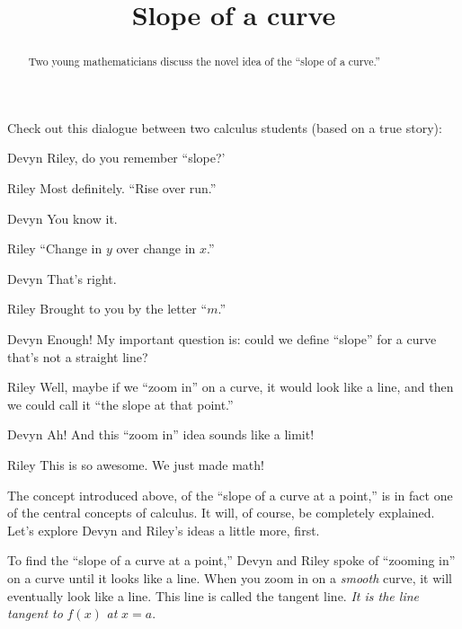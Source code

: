 \documentclass{ximera}
\title[Break-Ground:]{Slope of a curve}
\begin{document}
\begin{abstract}
Two young mathematicians discuss the novel idea of the ``slope of a curve.''
\end{abstract}
\maketitle


Check out this dialogue between two calculus students (based on a true
story):

\begin{dialogue}
\item[Devyn] Riley, do you remember ``slope?'
\item[Riley] Most definitely. ``Rise over run.''
\item[Devyn] You know it.
\item[Riley] ``Change in $y$ over change in $x$.''
\item[Devyn] That's right.  
\item[Riley] Brought to you by the letter ``$m$.''
\item[Devyn] Enough! My important question is: could we define
  ``slope'' for a curve that's not a straight line?
\item[Riley] Well, maybe if we ``zoom in'' on a curve, it would look
  like a line, and then we could call it ``the slope at that point.''
\item[Devyn] Ah! And this ``zoom in'' idea sounds like a limit!
\item[Riley] This is so awesome. We just made math!
\end{dialogue}

The concept introduced above, of the ``slope of a curve at a point,''
is in fact one of the central concepts of calculus. It will,
of course, be completely explained.  Let's explore Devyn
and Riley's ideas a little more, first.



To find the ``slope of a curve at a point,'' Devyn and Riley spoke of
``zooming in'' on a curve until it looks like a line. When you zoom in
on a \textit{smooth} curve, it will eventually look like a line. This
line is called the tangent line. \textit{It is the line tangent to} $f(x)$ \textit{at} $x=a$.
\end{document}
